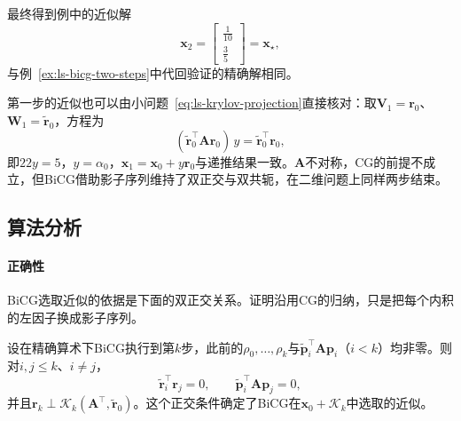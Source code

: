 最终得到例中的近似解
\[
 \bm x_2=\begin{bmatrix}\tfrac1{10}\\\tfrac35\end{bmatrix}=\bm x_\star ,
\]
与例~\ref{ex:ls-bicg-two-steps}中代回验证的精确解相同。

第一步的近似也可以由小问题~\eqref{eq:ls-krylov-projection}直接核对：取$\bm V_1=\bm r_0$、$\bm W_1=\widetilde{\bm r}_0$，方程为
\[
 (\widetilde{\bm r}_0^\top\bm A\bm r_0)\,y=\widetilde{\bm r}_0^\top\bm r_0 ,
\]
即$22y=5$，$y=\alpha_0$，$\bm x_1=\bm x_0+y\bm r_0$与递推结果一致。$\bm A$不对称，CG的前提不成立，但BiCG借助影子序列维持了双正交与双共轭，在二维问题上同样两步结束。

\subsection{算法分析}

\paragraph{正确性}
BiCG选取近似的依据是下面的双正交关系。证明沿用CG的归纳，只是把每个内积的左因子换成影子序列。

\begin{theorem}[BiCG的双正交性]
\label{thm:ls-bicg-biorthogonality}
设在精确算术下BiCG执行到第$k$步，此前的$\rho_0,\ldots,\rho_k$与$\widetilde{\bm p}_i^\top\bm A\bm p_i$（$i<k$）均非零。则对$i,j\le k$、$i\ne j$，
\begin{equation}
 \widetilde{\bm r}_i^\top\bm r_j=0,\qquad \widetilde{\bm p}_i^\top\bm A\bm p_j=0,
 \label{eq:ls-bicg-biorthogonality-relations}
\end{equation}
并且$\bm r_k\perp\mathcal K_k(\bm A^\top,\widetilde{\bm r}_0)$。这个正交条件确定了BiCG在$\bm x_0+\mathcal K_k$中选取的近似。
\end{theorem}

